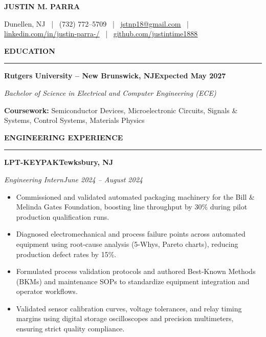 \documentclass[10pt]{article}
\newcommand{\ulink}[2]{\href{#1}{\underline{#2}}}
\newcommand{\Section}[1]{%
  \vspace{2.5pt}%
  \textbf{\MakeUppercase{#1}}\par\vspace{-3.5pt}%
  \rule{\linewidth}{0.5pt}\par\vspace{1.2pt}%
}
\newcommand{\Company}[2]{\noindent\textbf{#1}\hfill\textbf{#2}\par}
\newcommand{\RoleDates}[2]{\noindent\textit{#1}\hfill\textit{#2}\par}
\begin{document}
\begin{center}
  {\Large \textbf{JUSTIN M. PARRA}}\par\vspace{1.0pt}
  {\small
  Dunellen, NJ ~|~ (732) 772--5709 ~|~
  \ulink{mailto:jstnp18@gmail.com}{jstnp18@gmail.com} ~|~
  \ulink{https://www.linkedin.com/in/justin-parra-/}{linkedin.com/in/justin-parra-/} ~|~
  \ulink{https://github.com/justintime1888}{github.com/justintime1888}
  }
\end{center}

\Section{Education}
\Company{Rutgers University -- New Brunswick, NJ}{Expected May 2027}
\RoleDates{Bachelor of Science in Electrical and Computer Engineering (ECE)}{}
\vspace{0.2pt}
{\footnotesize \textbf{Coursework:} Semiconductor Devices, Microelectronic Circuits, Signals \& Systems, Control Systems, Materials Physics}

\Section{Engineering Experience}

\Company{LPT-KEYPAK}{Tewksbury, NJ}
\RoleDates{Engineering Intern}{June 2024 -- August 2024}
\begin{itemize}
  \item Commissioned and validated automated packaging machinery for the Bill \& Melinda Gates Foundation, boosting line throughput by 30\% during pilot production qualification runs.
  \item Diagnosed electromechanical and process failure points across automated equipment using root-cause analysis (5-Whys, Pareto charts), reducing production defect rates by 15\%.
  \item Formulated process validation protocols and authored Best-Known Methods (BKMs) and maintenance SOPs to standardize equipment integration and operator workflows.
  \item Validated sensor calibration curves, voltage tolerances, and relay timing margins using digital storage oscilloscopes and precision multimeters, ensuring strict quality compliance.
\end{itemize}
\end{document}
